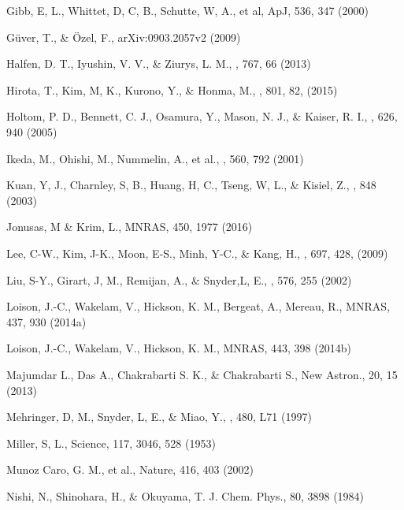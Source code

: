 \documentclass{aastex61}
\begin{document}
\begin{thebibliography}{}
 Gibb, E, L., Whittet, D, C, B., Schutte, W, A., et al, ApJ, 536, 347 (2000) 

 G\"{u}ver, T., \& \"{O}zel, F., arXiv:0903.2057v2 (2009)

 Halfen, D. T., Iyushin, V. V., \& Ziurys, L. M., \apj, 767, 66 (2013)

 Hirota, T., Kim, M, K., Kurono, Y., \& Honma, M., \apj,  801, 82, (2015)

 Holtom, P. D., Bennett, C. J., Osamura, Y., Mason, N. J., \& Kaiser, R. I., \apj, 626, 940 (2005)

 Ikeda, M., Ohishi, M., Nummelin, A., et al., \apj, 560, 792 (2001)

 Kuan, Y, J., Charnley, S, B., Huang, H, C., Tseng, W, L., \& Kisiel, Z.,  , 848 (2003)

 Jonusas, M \& Krim, L., MNRAS, 450, 1977 (2016)

 Lee, C-W., Kim, J-K., Moon, E-S., Minh, Y-C., \& Kang, H., \apj, 697, 428, (2009)

 Liu, S-Y., Girart, J, M., Remijan, A., \& Snyder,L, E., \apj, 576, 255 (2002)

 Loison, J.-C., Wakelam, V., Hickson, K. M., Bergeat, A., Mereau, R., MNRAS, 437, 930 (2014a)

 Loison, J.-C., Wakelam, V., Hickson, K. M., MNRAS, 443, 398 (2014b)

 Majumdar L., Das A., Chakrabarti S. K., \& Chakrabarti S., New Astron., 20, 15 (2013) 

 Mehringer, D, M., Snyder, L, E., \& Miao, Y., \apj, 480, L71 (1997)

 Miller, S, L., Science, 117, 3046, 528 (1953)

 Munoz Caro, G. M., et al., Nature, 416, 403 (2002)

 Nishi, N., Shinohara, H., \& Okuyama, T. J. Chem. Phys., 80, 3898 (1984)


\end{thebibliography}
\end{document}
